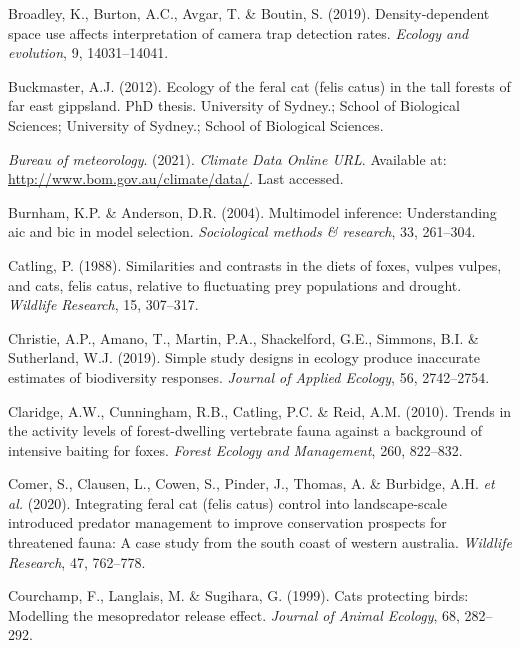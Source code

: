 \documentclass[]{elsarticle} %
\begin{document}
\leavevmode\hypertarget{ref-broadley2019}{}%
Broadley, K., Burton, A.C., Avgar, T. \& Boutin, S. (2019). Density-dependent space use affects interpretation of camera trap detection rates. \emph{Ecology and evolution}, 9, 14031--14041.

\leavevmode\hypertarget{ref-2123-8123}{}%
Buckmaster, A.J. (2012). Ecology of the feral cat (felis catus) in the tall forests of far east gippsland. PhD thesis. University of Sydney.; School of Biological Sciences; University of Sydney.; School of Biological Sciences.

\leavevmode\hypertarget{ref-BOM2021}{}%
\emph{Bureau of meteorology}. (2021). \emph{Climate Data Online URL}. Available at: \url{http://www.bom.gov.au/climate/data/}. Last accessed.

\leavevmode\hypertarget{ref-burnham2004}{}%
Burnham, K.P. \& Anderson, D.R. (2004). Multimodel inference: Understanding aic and bic in model selection. \emph{Sociological methods \& research}, 33, 261--304.

\leavevmode\hypertarget{ref-catling1988}{}%
Catling, P. (1988). Similarities and contrasts in the diets of foxes, vulpes vulpes, and cats, felis catus, relative to fluctuating prey populations and drought. \emph{Wildlife Research}, 15, 307--317.

\leavevmode\hypertarget{ref-christie2019}{}%
Christie, A.P., Amano, T., Martin, P.A., Shackelford, G.E., Simmons, B.I. \& Sutherland, W.J. (2019). Simple study designs in ecology produce inaccurate estimates of biodiversity responses. \emph{Journal of Applied Ecology}, 56, 2742--2754.

\leavevmode\hypertarget{ref-claridge2010}{}%
Claridge, A.W., Cunningham, R.B., Catling, P.C. \& Reid, A.M. (2010). Trends in the activity levels of forest-dwelling vertebrate fauna against a background of intensive baiting for foxes. \emph{Forest Ecology and Management}, 260, 822--832.

\leavevmode\hypertarget{ref-comer2020integrating}{}%
Comer, S., Clausen, L., Cowen, S., Pinder, J., Thomas, A. \& Burbidge, A.H. \emph{et al.} (2020). Integrating feral cat (felis catus) control into landscape-scale introduced predator management to improve conservation prospects for threatened fauna: A case study from the south coast of western australia. \emph{Wildlife Research}, 47, 762--778.

\leavevmode\hypertarget{ref-courchamp1999}{}%
Courchamp, F., Langlais, M. \& Sugihara, G. (1999). Cats protecting birds: Modelling the mesopredator release effect. \emph{Journal of Animal Ecology}, 68, 282--292.
\end{document}
